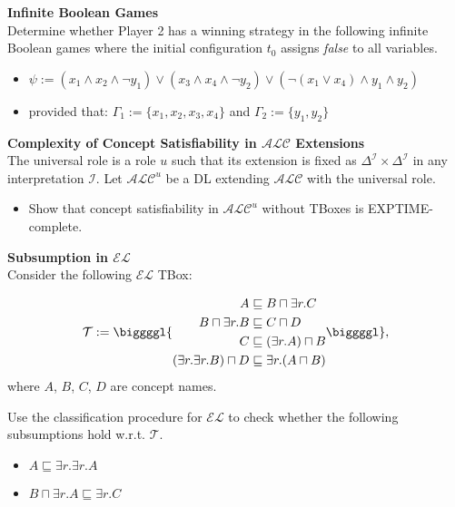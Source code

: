 \documentclass[12pt,a4paper]{article}
\newcommand{\alc}{$\mathcal{ALC}$\xspace}
\newenvironment{problem}[2][{\color{red}Question}]{\begin{trivlist}
\item[\hskip \labelsep {\bfseries #1}\hskip \labelsep {\bfseries #2.}]}{\end{trivlist}}
\begin{document}
\begin{problem}{{\color{red}3}}
\textbf{Infinite Boolean Games}\\
Determine whether Player \textsf{2} has a winning strategy in the following infinite Boolean games where the initial configuration $t_{0}$ assigns \emph{false} to all variables.
\begin{itemize}
    \item[-] $\psi :=(x_{1}\wedge x_{2}\wedge\neg y_{1})\vee(x_{3}\wedge x_{4}\wedge\neg y_{2})\vee(\neg(x_{1}\vee x_{4})\wedge y_{1}\wedge y_{2})$
    \item[] provided that: $\Gamma_{1}:=\{x_{1}, x_{2}, x_{3}, x_{4}\}$ and $\Gamma_{2}:=\{y_{1}, y_{2}\}$
\end{itemize}
\end{problem}

\begin{problem}{{\color{red}4}}
\textbf{Complexity of Concept Satisfiability in \alc Extensions}\\
The universal role is a role $u$ such that its extension is fixed as $\Delta^{\mathcal{I}}\times\Delta^{\mathcal{I}}$ in any
interpretation $\mathcal{I}$. Let $\mathcal{ALC}^{u}$ be a DL extending \alc with the universal role. 
\begin{itemize}
\item[-] Show that concept satisfiability in $\mathcal{ALC}^{u}$ without TBoxes is EXPTIME-complete.
\end{itemize}
\end{problem}

\begin{problem}{{\color{red}5}}
\textbf{Subsumption in $\mathcal{EL}$}\\
Consider the following $\mathcal{EL}$ TBox:

\begin{equation*}
  \mathcal{T}:=\biggggl\{
  \begin{aligned}
  A&\sqsubseteq B\sqcap\exists r.C\\
  B\sqcap\exists r.B&\sqsubseteq C\sqcap D\\
  C&\sqsubseteq(\exists r.A)\sqcap B\\
  (\exists r.\exists r.B)\sqcap D&\sqsubseteq\exists r.(A\sqcap B)
  \end{aligned}
  \biggggl\},
\end{equation*}where $A$, $B$, $C$, $D$ are concept names. 

Use the classification procedure for $\mathcal{EL}$ to check whether the following subsumptions hold w.r.t. $\mathcal{T}$.
\begin{itemize}
\item[-] $A\sqsubseteq\exists r.\exists r.A$
\item[-] $B\sqcap\exists r.A\sqsubseteq\exists r.C$
\end{itemize}
\end{problem}
\end{document}
